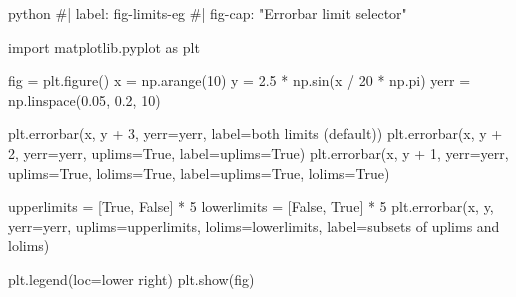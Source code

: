 \documentclass[
  letterpaper,
  DIV=11,
  numbers=noendperiod,
  oneside]{scrartcl}
\newenvironment{Shaded}{\begin{snugshade}}{\end{snugshade}}
\newcommand{\CommentTok}[1]{\textcolor[rgb]{0.37,0.37,0.37}{#1}}
\newcommand{\DecValTok}[1]{\textcolor[rgb]{0.68,0.00,0.00}{#1}}
\newcommand{\FloatTok}[1]{\textcolor[rgb]{0.68,0.00,0.00}{#1}}
\newcommand{\ImportTok}[1]{\textcolor[rgb]{0.00,0.46,0.62}{#1}}
\newcommand{\InformationTok}[1]{\textcolor[rgb]{0.37,0.37,0.37}{#1}}
\newcommand{\NormalTok}[1]{\textcolor[rgb]{0.00,0.23,0.31}{#1}}
\newcommand{\OperatorTok}[1]{\textcolor[rgb]{0.37,0.37,0.37}{#1}}
\newcommand{\StringTok}[1]{\textcolor[rgb]{0.13,0.47,0.30}{#1}}
\newcommand{\VariableTok}[1]{\textcolor[rgb]{0.07,0.07,0.07}{#1}}
\begin{document}
\begin{Shaded}
\begin{Highlighting}[]
\InformationTok{\textasciigrave{}\textasciigrave{}\textasciigrave{}python}
\CommentTok{\#| label: fig{-}limits{-}eg}
\CommentTok{\#| fig{-}cap: "Errorbar limit selector"}

\ImportTok{import}\NormalTok{ matplotlib.pyplot }\ImportTok{as}\NormalTok{ plt}

\NormalTok{fig }\OperatorTok{=}\NormalTok{ plt.figure()}
\NormalTok{x }\OperatorTok{=}\NormalTok{ np.arange(}\DecValTok{10}\NormalTok{)}
\NormalTok{y }\OperatorTok{=} \FloatTok{2.5} \OperatorTok{*}\NormalTok{ np.sin(x }\OperatorTok{/} \DecValTok{20} \OperatorTok{*}\NormalTok{ np.pi)}
\NormalTok{yerr }\OperatorTok{=}\NormalTok{ np.linspace(}\FloatTok{0.05}\NormalTok{, }\FloatTok{0.2}\NormalTok{, }\DecValTok{10}\NormalTok{)}

\NormalTok{plt.errorbar(x, y }\OperatorTok{+} \DecValTok{3}\NormalTok{, yerr}\OperatorTok{=}\NormalTok{yerr, label}\OperatorTok{=}\StringTok{\textquotesingle{}both limits (default)\textquotesingle{}}\NormalTok{)}
\NormalTok{plt.errorbar(x, y }\OperatorTok{+} \DecValTok{2}\NormalTok{, yerr}\OperatorTok{=}\NormalTok{yerr, uplims}\OperatorTok{=}\VariableTok{True}\NormalTok{, label}\OperatorTok{=}\StringTok{\textquotesingle{}uplims=True\textquotesingle{}}\NormalTok{)}
\NormalTok{plt.errorbar(x, y }\OperatorTok{+} \DecValTok{1}\NormalTok{, yerr}\OperatorTok{=}\NormalTok{yerr, uplims}\OperatorTok{=}\VariableTok{True}\NormalTok{, lolims}\OperatorTok{=}\VariableTok{True}\NormalTok{,}
\NormalTok{             label}\OperatorTok{=}\StringTok{\textquotesingle{}uplims=True, lolims=True\textquotesingle{}}\NormalTok{)}

\NormalTok{upperlimits }\OperatorTok{=}\NormalTok{ [}\VariableTok{True}\NormalTok{, }\VariableTok{False}\NormalTok{] }\OperatorTok{*} \DecValTok{5}
\NormalTok{lowerlimits }\OperatorTok{=}\NormalTok{ [}\VariableTok{False}\NormalTok{, }\VariableTok{True}\NormalTok{] }\OperatorTok{*} \DecValTok{5}
\NormalTok{plt.errorbar(x, y, yerr}\OperatorTok{=}\NormalTok{yerr, uplims}\OperatorTok{=}\NormalTok{upperlimits, lolims}\OperatorTok{=}\NormalTok{lowerlimits,}
\NormalTok{             label}\OperatorTok{=}\StringTok{\textquotesingle{}subsets of uplims and lolims\textquotesingle{}}\NormalTok{)}

\NormalTok{plt.legend(loc}\OperatorTok{=}\StringTok{\textquotesingle{}lower right\textquotesingle{}}\NormalTok{)}
\NormalTok{plt.show(fig)}
\InformationTok{\textasciigrave{}\textasciigrave{}\textasciigrave{}}
\end{Highlighting}
\end{Shaded}
\end{document}
